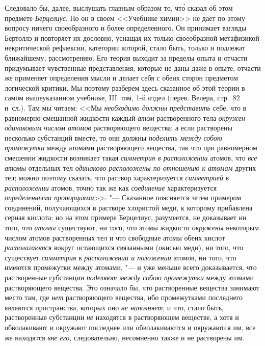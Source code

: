 Следовало бы, далее, выслушать главным образом то, чт\'{о} сказал об этом
предмете {\em Берцелиус}. Но он в своем <<Учебнике химии>> не дает по этому
вопросу ничего своеобразного и более определенного. Он принимает взгляды
Бертоллэ и повторяет их дословно, уснащая их только своеобразной метафизикой
некритической рефлексии, категории которой, стало быть, только и подлежат
ближайшему, рассмотрению. Его теория выходит за пределы опыта и отчасти
придумывает чувственные представления, которые не даны даже в опыте, отчасти же
применяет определения мысли и делает себя с обеих сторон предметом логической
критики. Мы поэтому разберем здесь сказанное об этой теории в самом
вышеуказанном учебнике, III~том, 1-й отдел (перев. Велера, стр.~82 и~сл.). Там
мы читаем: <<Мы {\em необходимо должны представить} себе, что в равномерно
смешанной жидкости каждый {\em атом} растворенного тела
{\em окружен одинаковым числом атомов} растворяющего вещества; а если
растворены несколько субстанций вместе, то они должны {\em поделить между собою
промежутки} между атомами растворяющего вещества, так что при равномерном
смешении жидкости возникает такая {\em симметрия в расположении} атомов, что
{\em все атомы} отдельных тел {\em одинаково расположены по отношению к атомам}
других тел; можно поэтому сказать, что раствор характеризуется {\em симметрией}
в {\em расположении} атомов, точно так же как {\em соединение} характеризуется
{\em определенными пропорциями}>>. "--- Сказанное поясняется затем примером
соединений, получающихся в растворе хлористой меди, к которому прибавлена
серная кислота; но на этом примере Берцелиус, разумеется, не доказывает ни
того, что {\em атомы} существуют, ни того, что атомы жидкости {\em окружены}
некоторым числом атомов растворенных тел и что свободные атомы обеих кислот
{\em располагаются} вокруг остающихся связанными (окисью меди), ни того, что
существует {\em симметрия} в {\em расположении и положении} атомов, ни того,
что имеются промежутки между атомами, "--- и уже меньше всего доказывается, что
растворенные субстанции {\em поделяют между собою промежутки} между атомами
растворяющего вещества. Это означало бы, что растворенные вещества занимают
место там, где {\em нет} растворяющего вещества, ибо промежутками последнего
являются пространства, которых оно {\em не наполняет}, и что, стало быть,
растворенные субстанции {\em не} находятся в растворяющем веществе, а хотя и
обволакивают и окружают последнее или обволакиваются и окружаются им, все же
находятся {\em вне его}, следовательно, несомненно также и не растворены им.
